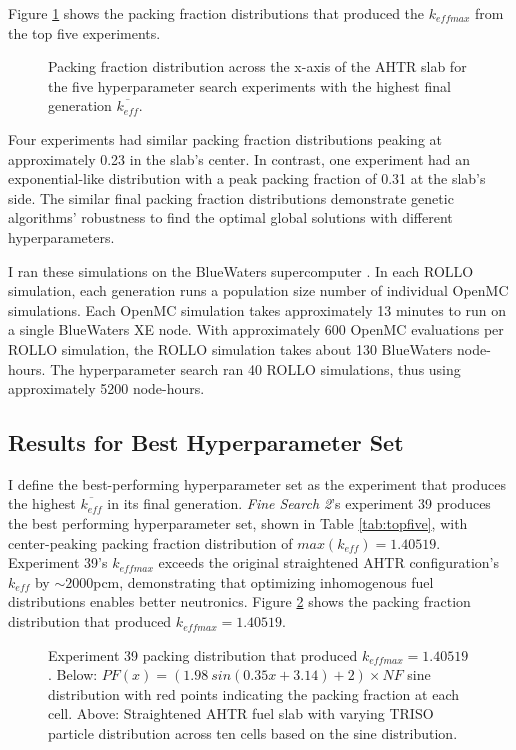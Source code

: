 Figure \ref{fig:topfiveplot} shows the packing fraction distributions that 
produced the $k_{eff max}$ from the top five experiments. 
\begin{figure}[]
    \centering
    \caption{Packing fraction distribution across the x-axis of the \acrfull{AHTR} 
    slab for the five hyperparameter search experiments with the highest final generation 
    $\overline{k_{eff}}$.}
    \label{fig:topfiveplot}
\end{figure}
Four experiments had similar packing fraction distributions peaking at approximately 
0.23 in the slab's center. 
In contrast, one experiment had an exponential-like distribution with a peak 
packing fraction of 0.31 at the slab's side.
The similar final packing fraction distributions demonstrate genetic algorithms' 
robustness to find the optimal global solutions with different hyperparameters. 

I ran these simulations on the BlueWaters supercomputer \cite{ncsa_about_2017}. 
In each \gls{ROLLO} simulation, each generation runs a population size number 
of individual OpenMC simulations. 
Each OpenMC simulation takes approximately 13 minutes to run on a single BlueWaters 
XE node. 
With approximately 600 OpenMC evaluations per \gls{ROLLO} simulation, the
\gls{ROLLO} simulation takes about 130 BlueWaters node-hours. 
The hyperparameter search ran 40 \gls{ROLLO} simulations, thus using approximately
5200 node-hours.

\subsection{Results for Best Hyperparameter Set}
\label{sec:best}
I define the best-performing hyperparameter set as the experiment that produces 
the highest $\overline{k_{eff}}$ in its final generation. 
\textit{Fine Search 2}'s experiment 39 produces the best performing 
hyperparameter set, shown in Table \ref{tab:topfive}, with 
center-peaking packing fraction distribution of $max(k_{eff}) = 1.40519$. 
Experiment 39's $k_{eff max}$ exceeds the original straightened \gls{AHTR} 
configuration's $k_{eff}$ by $\sim2000$pcm, demonstrating that optimizing
inhomogenous fuel distributions enables better neutronics. 
Figure \ref{fig:triso_distribution_sine_39} shows the packing fraction distribution 
that produced $k_{eff max} = 1.40519$. 
\begin{figure}[]
    \centering
    \caption{Experiment 39 packing distribution that produced $k_{eff max} = 1.40519$. 
    Below: $PF(x) = (1.98\ sin(0.35x+3.14)+2)  \times NF$ sine distribution with 
    red points indicating the packing fraction at each cell. 
    Above: Straightened \acrfull{AHTR} fuel slab with varying \gls{TRISO} particle 
    distribution across ten cells based on the sine distribution. }
    \label{fig:triso_distribution_sine_39}
\end{figure}

